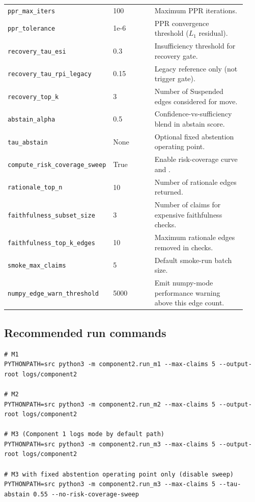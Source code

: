 \begin{longtable}{@{}p{0.35\linewidth}p{0.18\linewidth}p{0.40\linewidth}@{}}
\texttt{ppr\_max\_iters} & 100 & Maximum PPR iterations. \\
\texttt{ppr\_tolerance} & 1e-6 & PPR convergence threshold ($L_1$ residual). \\
\texttt{recovery\_tau\_esi} & 0.3 & Insufficiency threshold for recovery gate. \\
\texttt{recovery\_tau\_rpi\_legacy} & 0.15 & Legacy reference only (not trigger gate). \\
\texttt{recovery\_top\_k} & 3 & Number of Suspended edges considered for move. \\
\texttt{abstain\_alpha} & 0.5 & Confidence-vs-sufficiency blend in abstain score. \\
\texttt{tau\_abstain} & None & Optional fixed abstention operating point. \\
\texttt{compute\_risk\_coverage\_sweep} & True & Enable risk-coverage curve and \AURC{}. \\
\texttt{rationale\_top\_n} & 10 & Number of rationale edges returned. \\
\texttt{faithfulness\_subset\_size} & 3 & Number of claims for expensive faithfulness checks. \\
\texttt{faithfulness\_top\_k\_edges} & 10 & Maximum rationale edges removed in checks. \\
\texttt{smoke\_max\_claims} & 5 & Default smoke-run batch size. \\
\texttt{numpy\_edge\_warn\_threshold} & 5000 & Emit numpy-mode performance warning above this edge count. \\
\bottomrule
\end{longtable}

\subsection{Recommended run commands}
\begin{verbatim}
# M1
PYTHONPATH=src python3 -m component2.run_m1 --max-claims 5 --output-root logs/component2

# M2
PYTHONPATH=src python3 -m component2.run_m2 --max-claims 5 --output-root logs/component2

# M3 (Component 1 logs mode by default path)
PYTHONPATH=src python3 -m component2.run_m3 --max-claims 5 --output-root logs/component2

# M3 with fixed abstention operating point only (disable sweep)
PYTHONPATH=src python3 -m component2.run_m3 --max-claims 5 --tau-abstain 0.55 --no-risk-coverage-sweep
\end{verbatim}


